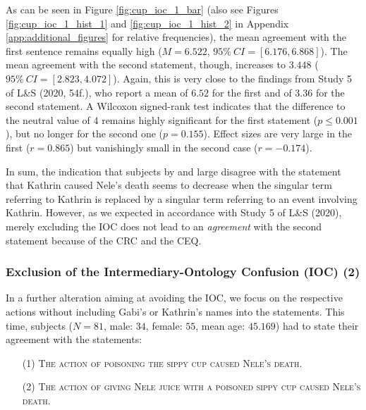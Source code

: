 \documentclass[egregdoesnotlikesansseriftitles,12pt]{scrartcl}
\begin{document}
\noindent As can be seen in Figure \ref{fig:cup_ioc_1_bar} (also see Figures \ref{fig:cup_ioc_1_hist_1} and \ref{fig:cup_ioc_1_hist_2} in Appendix \ref{app:additional_figures} for relative frequencies), the mean agreement with the first sentence remains equally high ($M=6.522$, $95\%~CI=[6.176,6.868]$). The mean agreement with the second statement, though, increases to $3.448$ ($95\%~CI=[2.823,4.072]$). Again, this is very close to the findings from Study 5 of L\&S (2020, 54f.), who report a mean of $6.52$ for the first and of $3.36$ for the second statement. A Wilcoxon signed-rank test indicates that the difference to the neutral value of $4$ remains highly significant for the first statement ($p \leq 0.001$), but no longer for the second one ($p=0.155$). Effect sizes are very large in the first ($r=0.865$) but vanishingly small in the second case ($r=-0.174$). 

In sum, the indication that subjects by and large disagree with the statement that Kathrin caused Nele's death seems to decrease when the singular term referring to Kathrin is replaced by a singular term referring to an event involving Kathrin. However, as we expected in accordance with Study 5 of L\&S (2020), merely excluding the IOC does not lead to an \textit{agreement} with the second statement because of the CRC and the CEQ.

\subsubsection{Exclusion of the Intermediary-Ontology Confusion (IOC) (2)}\label{sec:results_cup_ioc_2}
In a further alteration aiming at avoiding the IOC, we focus on the respective actions without including Gabi's or Kathrin's names into the statements. This time, subjects ($N=81$, male: $34$, female: $55$, mean age: $45.169$) had to state their agreement with the statements:

\begin{itemize}
   \item[(1)]\textsc{The action of poisoning the sippy cup caused Nele's death.}
   \item[(2)]\textsc{The action of giving Nele juice with a poisoned sippy cup caused Nele's death.}
\end{itemize}
\end{document}
